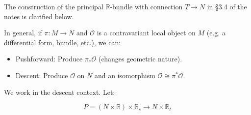 The construction of the principal $\mathbb{R}$-bundle with connection $T \to N$ in §3.4 of the notes is clarified below.

In general, if $\pi: M \to N$ and $\mathscr{O}$ is a contravariant local object on $M$ (e.g. a differential form, bundle, etc.), we can:
\begin{itemize}
    \item Pushforward: Produce $\pi_* \mathscr{O}$ (changes geometric nature).
    \item Descent: Produce $\overline{\mathscr{O}}$ on $N$ and an isomorphism $\mathscr{O} \cong \pi^* \overline{\mathscr{O}}$.
\end{itemize}

We work in the descent context. Let:

\[
P = (N \times \mathbb{R}) \times \mathbb{R}_s \rightarrow N \times \mathbb{R}_t
\]

